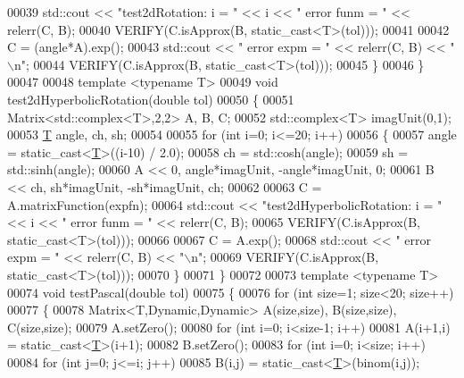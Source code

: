 \begin{DoxyCode}
00039     std::cout << \textcolor{stringliteral}{"test2dRotation: i = "} << i << \textcolor{stringliteral}{"   error funm = "} << relerr(C, B);
00040     VERIFY(C.isApprox(B, static\_cast<T>(tol)));
00041 
00042     C = (angle*A).exp();
00043     std::cout << \textcolor{stringliteral}{"   error expm = "} << relerr(C, B) << \textcolor{stringliteral}{"\(\backslash\)n"};
00044     VERIFY(C.isApprox(B, static\_cast<T>(tol)));
00045   \}
00046 \}
00047 
00048 \textcolor{keyword}{template} <\textcolor{keyword}{typename} T>
00049 \textcolor{keywordtype}{void} test2dHyperbolicRotation(\textcolor{keywordtype}{double} tol)
00050 \{
00051   Matrix<std::complex<T>,2,2> A, B, C;
00052   std::complex<T> imagUnit(0,1);
00053   \hyperlink{group___sparse_core___module_class_eigen_1_1_triplet}{T} angle, ch, sh;
00054 
00055   \textcolor{keywordflow}{for} (\textcolor{keywordtype}{int} i=0; i<=20; i++)
00056   \{
00057     angle = \textcolor{keyword}{static\_cast<}\hyperlink{group___sparse_core___module_class_eigen_1_1_triplet}{T}\textcolor{keyword}{>}((i-10) / 2.0);
00058     ch = std::cosh(angle);
00059     sh = std::sinh(angle);
00060     A << 0, angle*imagUnit, -angle*imagUnit, 0;
00061     B << ch, sh*imagUnit, -sh*imagUnit, ch;
00062 
00063     C = A.matrixFunction(expfn);
00064     std::cout << \textcolor{stringliteral}{"test2dHyperbolicRotation: i = "} << i << \textcolor{stringliteral}{"   error funm = "} << relerr(C, B);
00065     VERIFY(C.isApprox(B, static\_cast<T>(tol)));
00066 
00067     C = A.exp();
00068     std::cout << \textcolor{stringliteral}{"   error expm = "} << relerr(C, B) << \textcolor{stringliteral}{"\(\backslash\)n"};
00069     VERIFY(C.isApprox(B, static\_cast<T>(tol)));
00070   \}
00071 \}
00072 
00073 \textcolor{keyword}{template} <\textcolor{keyword}{typename} T>
00074 \textcolor{keywordtype}{void} testPascal(\textcolor{keywordtype}{double} tol)
00075 \{
00076   \textcolor{keywordflow}{for} (\textcolor{keywordtype}{int} size=1; size<20; size++)
00077   \{
00078     Matrix<T,Dynamic,Dynamic> A(size,size), B(size,size), C(size,size);
00079     A.setZero();
00080     \textcolor{keywordflow}{for} (\textcolor{keywordtype}{int} i=0; i<size-1; i++)
00081       A(i+1,i) = \textcolor{keyword}{static\_cast<}\hyperlink{group___sparse_core___module_class_eigen_1_1_triplet}{T}\textcolor{keyword}{>}(i+1);
00082     B.setZero();
00083     \textcolor{keywordflow}{for} (\textcolor{keywordtype}{int} i=0; i<size; i++)
00084       \textcolor{keywordflow}{for} (\textcolor{keywordtype}{int} j=0; j<=i; j++)
00085     B(i,j) = \textcolor{keyword}{static\_cast<}\hyperlink{group___sparse_core___module_class_eigen_1_1_triplet}{T}\textcolor{keyword}{>}(binom(i,j));

\end{DoxyCode}
